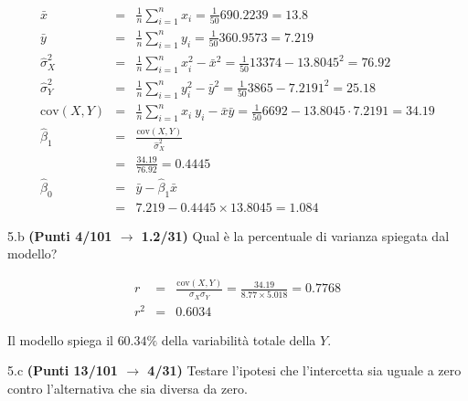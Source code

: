 \documentclass[
  11pt,
]{book}
\theoremstyle{mytheoremstyle}
\theoremstyle{mydefstyle}
\newenvironment{sol}
  {
  \begin{tcolorbox}[enhanced,breakable,arc=0.1mm,boxrule=1pt,colback=white,colframe=iblue,
  title=\bf \fontfamily{lmss}\selectfont \hspace{.5 cm} Soluzione,drop fuzzy shadow]

}{
\end{tcolorbox}
  }
\begin{document}
\begin{sol}
\begin{eqnarray*}
           \bar x &=&\frac 1 n\sum_{i=1}^n x_i = \frac {1}{ 50 }  690.2239 =  13.8 \\
           \bar y &=&\frac 1 n\sum_{i=1}^n y_i = \frac {1}{ 50 }  360.9573 =  7.219 \\
           \hat\sigma_X^2&=&\frac 1 n\sum_{i=1}^n x_i^2-\bar x^2=\frac {1}{ 50 }  13374  - 13.8045 ^2= 76.92 \\
           \hat\sigma_Y^2&=&\frac 1 n\sum_{i=1}^n y_i^2-\bar y^2=\frac {1}{ 50 }  3865  - 7.2191 ^2= 25.18 \\
           \text{cov}(X,Y)&=&\frac 1 n\sum_{i=1}^n x_i~y_i-\bar x\bar y=\frac {1}{ 50 }  6692 - 13.8045 \cdot 7.2191 = 34.19 \\
           \hat\beta_1 &=& \frac{\text{cov}(X,Y)}{\hat\sigma_X^2} \\
                    &=& \frac{ 34.19 }{ 76.92 }  =  0.4445 \\
           \hat\beta_0 &=& \bar y - \hat\beta_1 \bar x\\
                    &=&  7.219 - 0.4445 \times  13.8045 = 1.084 
         \end{eqnarray*}

\end{sol}

5.b \textbf{(Punti 4/101 \(\rightarrow\) 1.2/31)} Qual è la percentuale di varianza spiegata dal modello?

\begin{sol}
\begin{eqnarray*}
r&=&\frac{\text{cov}(X,Y)}{\sigma_X\sigma_Y}=\frac{ 34.19 }{ 8.77 \times 5.018 }= 0.7768 \\ 
r^2&=& 0.6034\end{eqnarray*}

Il modello spiega il \(60.34\%\) della variabilità totale della \(Y\).

\end{sol}

5.c \textbf{(Punti 13/101 \(\rightarrow\) 4/31)} Testare l'ipotesi che l'intercetta sia uguale a zero contro l'alternativa che sia diversa da zero.
\end{document}
